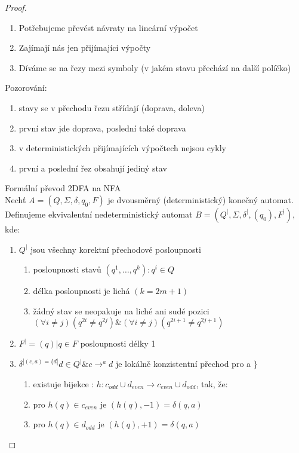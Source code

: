 \documentclass[../main.tex]{subfiles}
\begin{document}
\begin{proof}
    \begin{enumerate}
        \item Potřebujeme převést návraty na lineární výpočet
        \item Zajímají nás jen přijímajíci výpočty
        \item Díváme se na řezy mezi symboly (v jakém stavu přechází na další políčko)
    \end{enumerate}        

    Pozorování:
    \begin{enumerate}
        \item stavy se v přechodu řezu střídají (doprava, doleva)
        \item první stav jde doprava, poslední také doprava
        \item v deterministických přijímajících výpočtech nejsou cykly
        \item první a poslední řez obsahují jediný stav
    \end{enumerate}

    Formální převod 2DFA na NFA\\

    Nechť $A = (Q,\Sigma, \delta, q_0,F)$ je dvousměrný (deterministický) konečný automat.
    Definujeme ekvivalentní nedeterministický automat $B = (Q^|,\Sigma,\delta^|,(q_0),F^|)$, kde:
    \begin{enumerate}
        \item $Q^|$ jsou všechny korektní přechodové posloupnosti
        \begin{enumerate}
            \item posloupnosti stavů $(q^1,\dots,q^k): q^i \in Q$
            \item délka posloupnosti je lichá $(k = 2m+1)$
            \item žádný stav se neopakuje na liché ani sudé pozici $(\forall i \neq j) (q^{2i} \neq q^{2j})
            \& (\forall i \neq j)(q^{2i+1}\neq q^{2j+1})$
        \end{enumerate}
        \item $F^| = {(q)|q \in F}$ posloupnosti délky 1
        \item $\delta^|(c,a) = \{d|d\in Q^| \& c\rightarrow^a  d $ je lokálně konzistentní přechod pro a $\}$
        \begin{enumerate}
            \item existuje bijekce : $h : c_{odd}\cup d_{even} \rightarrow c_{even}\cup d_{odd}$, tak, že:
            \item pro $h(q) \in c_{even}$ je $(h(q),-1) = \delta(q,a)$
            \item pro $h(q) \in d_{odd}$ je $(h(q),+1) = \delta(q,a)$
        \end{enumerate}
    \end{enumerate}
\end{proof}
\end{document}
